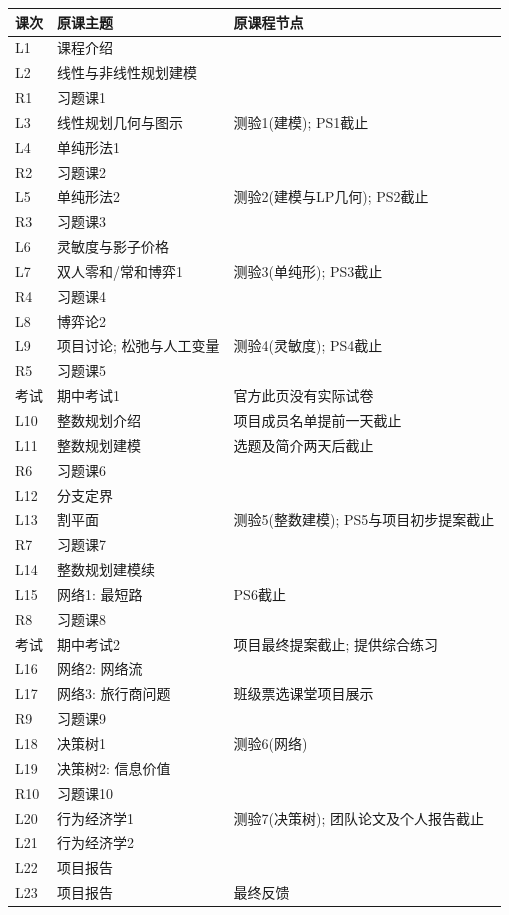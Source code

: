 \begin{longtable}{@{}p{0.9cm}p{8.4cm}p{6.2cm}@{}}
\toprule 课次 & 原课主题 & 原课程节点\\\midrule\endhead
L1 & 课程介绍 & \\
L2 & 线性与非线性规划建模 & \\
R1 & 习题课1 & \\
L3 & 线性规划几何与图示 & 测验1(建模); PS1截止\\
L4 & 单纯形法1 & \\
R2 & 习题课2 & \\
L5 & 单纯形法2 & 测验2(建模与LP几何); PS2截止\\
R3 & 习题课3 & \\
L6 & 灵敏度与影子价格 & \\
L7 & 双人零和/常和博弈1 & 测验3(单纯形); PS3截止\\
R4 & 习题课4 & \\
L8 & 博弈论2 & \\
L9 & 项目讨论; 松弛与人工变量 & 测验4(灵敏度); PS4截止\\
R5 & 习题课5 & \\
考试 & 期中考试1 & 官方此页没有实际试卷\\
L10 & 整数规划介绍 & 项目成员名单提前一天截止\\
L11 & 整数规划建模 & 选题及简介两天后截止\\
R6 & 习题课6 & \\
L12 & 分支定界 & \\
L13 & 割平面 & 测验5(整数建模); PS5与项目初步提案截止\\
R7 & 习题课7 & \\
L14 & 整数规划建模续 & \\
L15 & 网络1: 最短路 & PS6截止\\
R8 & 习题课8 & \\
考试 & 期中考试2 & 项目最终提案截止; 提供综合练习\\
L16 & 网络2: 网络流 & \\
L17 & 网络3: 旅行商问题 & 班级票选课堂项目展示\\
R9 & 习题课9 & \\
L18 & 决策树1 & 测验6(网络)\\
L19 & 决策树2: 信息价值 & \\
R10 & 习题课10 & \\
L20 & 行为经济学1 & 测验7(决策树); 团队论文及个人报告截止\\
L21 & 行为经济学2 & \\
L22 & 项目报告 & \\
L23 & 项目报告 & 最终反馈\\\bottomrule
\end{longtable}
